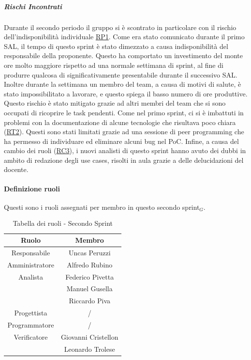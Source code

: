 \documentclass[10pt]{article}
\begin{document}
{{{    \subparagraph*{Rischi Incontrati}\mbox{}
    
    Durante il secondo periodo il gruppo si è scontrato in particolare con il rischio dell'indisponibilità individuale \hyperref[RP1]{RP1}. Come era stato comunicato durante il primo SAL, il tempo di questo sprint è stato dimezzato a causa indisponibilità del responsabile della proponente. Questo ha comportato un investimento del monte ore molto maggiore rispetto ad una normale settimana di sprint, al fine di produrre qualcosa di significativamente presentabile durante il successivo SAL. Inoltre durante la settimana un membro del team, a causa di motivi di salute, è stato impossibilitato a lavorare, e questo spiega il basso numero di ore produttive. Questo rischio è stato mitigato grazie ad altri membri del team che si sono occupati di ricoprire le task pendenti. Come nel primo sprint, ci si è imbattuti in problemi con la documentazione di alcune tecnologie che risultava poco chiara (\hyperref[RT2]{RT2}). Questi sono stati limitati grazie ad una sessione di peer programming che ha permesso di individuare ed eliminare alcuni bug nel PoC. Infine, a causa del cambio dei ruoli (\hyperref[RC3]{RC3}), i nuovi analisti di questo sprint hanno avuto dei dubbi in ambito di redazione degli use cases, risolti in aula grazie a delle delucidazioni del docente. 

    
    \paragraph{Definizione ruoli}\mbox{}\vspace{0.4em}
    
    Questi sono i ruoli assegnati per membro in questo secondo sprint$_G$.\\
    \begin{table}[H]
        \centering
        \begin{tabular}{|c|c|}
        \hline
        \rowcolor{gray!25}
        \textbf{Ruolo} & \textbf{Membro}\\
        \hline
        Responsabile & Uncas Peruzzi\\
        \hline
        Amministratore & Alfredo Rubino\\ 
        \hline
        Analista & Federico Pivetta\\
        & Manuel Gusella \\
        & Riccardo Piva\\
        \hline
        Progettista & / \\
        \hline
        Programmatore & / \\
        \hline
        Verificatore & Giovanni Cristellon\\
        & Leonardo Trolese\\
        \hline
        \end{tabular}
        \caption{Tabella dei ruoli - Secondo Sprint}
    \end{table}

}}}
\end{document}
